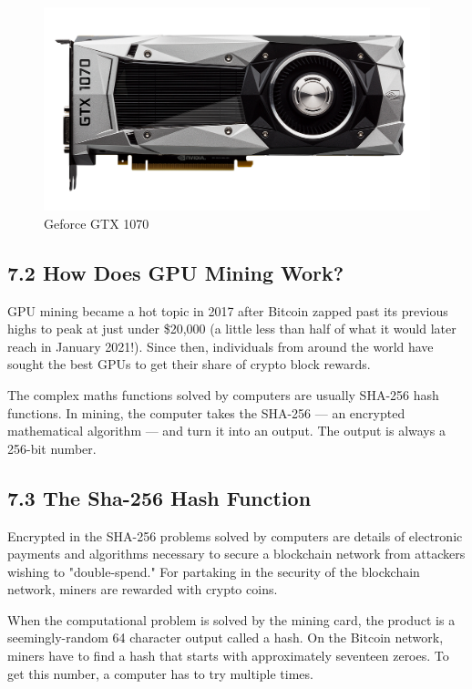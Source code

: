 \begin{figure}[h]
	\centering
	\includegraphics[width=0.7\linewidth]{images/geforce-gtx-1070-2c50-P@2x}
	\captionsetup{labelformat=empty}
	\caption{Geforce GTX 1070}
\end{figure}


\subsection*{7.2 How Does GPU Mining Work?}
GPU mining became a hot topic in 2017 after Bitcoin zapped past its previous highs to peak at just under \$20,000 (a little less than half of what it would later reach in January 2021!). Since then, individuals from around the world have sought the best GPUs to get their share of crypto block rewards.\vspace{.3 cm}

The complex maths functions solved by computers are usually SHA-256 hash functions. In mining, the computer takes the SHA-256 — an encrypted mathematical algorithm — and turn it into an output. The output is always a 256-bit number.\vspace{.3 cm}

\subsection*{7.3 The Sha-256 Hash Function}
Encrypted in the SHA-256 problems solved by computers are details of electronic payments and algorithms necessary to secure a blockchain network from attackers wishing to "double-spend." For partaking in the security of the blockchain network, miners are rewarded with crypto coins.\vspace{.3 cm}

When the computational problem is solved by the mining card, the product is a seemingly-random 64 character output called a hash. On the Bitcoin network, miners have to find a hash that starts with approximately seventeen zeroes. To get this number, a computer has to try multiple times.\vspace{.3 cm}

